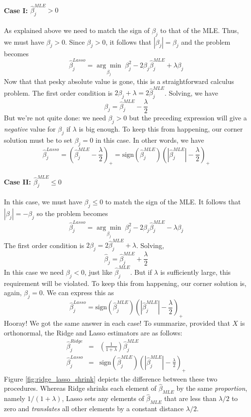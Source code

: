 \paragraph{Case I: $\widehat{\beta}^{MLE}_j >0$} As explained above we need to match the sign of $\beta_j$ to that of the MLE. Thus, we must have $\beta_j > 0$. Since $\beta_j >0$, it follows that $|\beta_j| = \beta_j$ and the problem becomes
	$$\widehat{\beta}^{Lasso}_j = \underset{\beta_j}{\arg \min} \; \beta_j^2 - 2 \beta_j \widehat{\beta}^{MLE}_j + \lambda\beta_j$$
Now that that pesky absolute value is gone, this is a straightforward calculus problem. The first order condition is $2\beta_j + \lambda = 2 \widehat{\beta}^{MLE}_j$. Solving, we have
	$$\beta_j = \widehat{\beta}^{MLE}_j - \frac{\lambda}{2}$$
But we're not quite done: we need $\beta_j > 0$ but the preceding expression will give a \emph{negative} value for $\beta_j$ if $\lambda$ is big enough. To keep this from happening, our corner solution must be to set $\beta_j = 0$ in this case. In other words, we have
	$$\widehat{\beta}^{Lasso}_j = \left(\widehat{\beta}^{MLE}_j - \frac{\lambda}{2} \right)_+ = \mbox{sign}\left(\widehat{\beta}^{MLE}_j \right)\left(\left| \widehat{\beta}^{MLE}_j\right| - \frac{\lambda}{2} \right)_+$$

\paragraph{Case II: $\widehat{\beta}^{MLE}_j \leq 0$} In this case, we must have $\beta_j \leq 0$ to match the sign of the MLE. It follows that $|\beta_j| = -\beta_j$ so the problem becomes
$$\widehat{\beta}^{Lasso}_j = \underset{\beta_j}{\arg \min} \; \beta_j^2 - 2 \beta_j \widehat{\beta}^{MLE}_j - \lambda\beta_j$$
The first order condition is $2\beta_j = 2\widehat{\beta}^{MLE}_j +\lambda$. Solving,
	$$\widehat{\beta}_j = \widehat{\beta}^{MLE}_j + \frac{\lambda}{2}$$
In this case we need $\beta_j <0$, just like $\widehat{\beta}^{MLE}_j$. But if $\lambda$ is sufficiently large, this requirement will be violated. To keep this from happening, our corner solution is, again, $\beta_j = 0$. We can express this as 
	$$\widehat{\beta}^{Lasso}_j =\mbox{sign}\left(\widehat{\beta}^{MLE}_j \right)\left(\left| \widehat{\beta}^{MLE}_j\right| - \frac{\lambda}{2} \right)_+$$
Hooray! We got the same answer in each case! To summarize, provided that $X$ is orthonormal, the Ridge and Lasso estimators are as follows:
	\begin{eqnarray*}
		\widehat{\beta}^{Ridge}_j &=&  \left(\frac{1}{1+\lambda}\right)\widehat{\beta}^{MLE}_j\\
		\widehat{\beta}^{Lasso}_j &=&\mbox{sign}\left(\widehat{\beta}^{MLE}_j \right)\left(\left| \widehat{\beta}^{MLE}_j\right| - \frac{\lambda}{2} \right)_+
	\end{eqnarray*}
Figure \ref{fig:ridge_lasso_shrink} depicts the difference between these two procedures. Whereas Ridge shrinks each element of $\widehat{\beta}_{MLE}$ by the same \emph{proportion}, namely $1/(1+\lambda)$, Lasso sets any elements of $\widehat{\beta}_{MLE}$ that are less than $\lambda/2$ to zero and \emph{translates} all other elements by a constant distance $\lambda/2$. 



